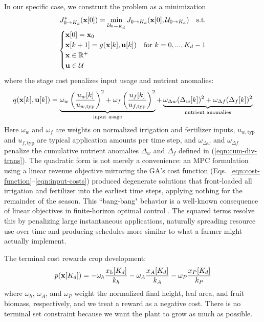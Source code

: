 \documentclass[pdflatex,sn-mathphys-num]{sn-jnl}
\newcommand{\df}[2]{\displaystyle\frac{#1}{#2}}
\begin{document}
In our specific case, we construct the problem as a minimization
\begin{equation}
\begin{array}{c}
J_{0\to K_{d}}^{*}({\bf x}[0]) = \min\limits_{\mathcal{U}_{0\to K_{d}}} J_{0\to K_{d}}({\bf x}[0], \mathcal{U}_{0\to K_{d}}) \quad \text{s.t.} \\[7pt]
\begin{cases}
{\bf x}[0] = {\bf x}_{0} \\
{\bf x}[k+1] = g({\bf x}[k], {\bf u}[k]) & \text{for } k=0,...,K_{d}-1 \\
{\bf x}\in\mathbb{R}^{+} \\
{\bf u}\in{\mathcal{U}}
\end{cases}
\end{array}
\label{eqn:minimization-cftoc}
\end{equation}
where the stage cost penalizes input usage and nutrient anomalies:
\begin{equation}
q({\bf x}[k], {\bf u}[k]) =
\underbrace{\omega_{w}\left( \df{u_{w}[k]}{u_{w,\text{typ}}} \right)^{2} +
\omega_{f}\left( \df{u_{f}[k]}{u_{f,\text{typ}}} \right)^{2}}_{\text{input usage}} +
\underbrace{\omega_{\Delta w}(\Delta_{w}[k])^{2} +
\omega_{\Delta f}(\Delta_{f}[k])^{2}}_{\text{nutrient anomalies}}
\label{eqn:stage-cost}
\end{equation}
Here $\omega_w$ and $\omega_f$ are weights on normalized irrigation and fertilizer inputs, $u_{w,\text{typ}}$ and $u_{f,\text{typ}}$ are typical application amounts per time step, and $\omega_{\Delta w}$ and $\omega_{\Delta f}$ penalize the cumulative nutrient anomalies $\Delta_w$ and $\Delta_f$ defined in (\ref{eqn:cum-div-trans}). The quadratic form is not merely a convenience: an MPC formulation using a linear revenue objective mirroring the GA's cost function (Eqs.~\ref{eqn:cost-function}--\ref{eqn:input-costs}) produced degenerate solutions that front-loaded all irrigation and fertilizer into the earliest time steps, applying nothing for the remainder of the season. This ``bang-bang" behavior is a well-known consequence of linear objectives in finite-horizon optimal control \cite{liberzon2012calculus}. The squared terms resolve this by penalizing large instantaneous applications, naturally spreading resource use over time and producing schedules more similar to what a farmer might actually implement.

The terminal cost rewards crop development:
\begin{equation}
p({\bf x}[K_{d}]) =
-\omega_{h}\df{x_{h}[K_{d}]}{k_{h}} -
\omega_{A}\df{x_{A}[K_{d}]}{k_{A}} -
\omega_{P}\df{x_{P}[K_{d}]}{k_{P}}
\label{eqn:terminal-cost}
\end{equation}
where $\omega_h$, $\omega_A$, and $\omega_P$ weight the normalized final height, leaf area, and fruit biomass, respectively, and we treat a reward as a negative cost. There is no terminal set constraint because we want the plant to grow as much as possible.
\end{document}
